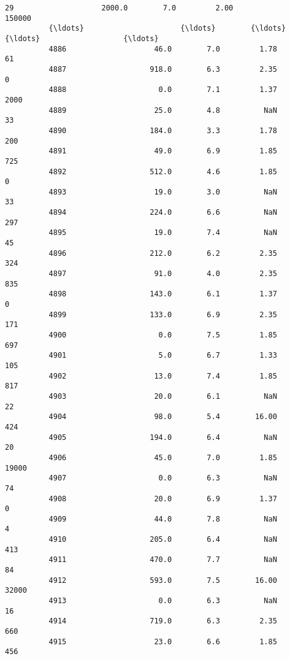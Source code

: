 \documentclass[11pt]{article}
\begin{document}
\begin{Verbatim}[commandchars=\\\{\}]
          29                    2000.0        7.0         2.00                150000   
          {\ldots}                      {\ldots}        {\ldots}          {\ldots}                   {\ldots}   
          4886                    46.0        7.0         1.78                    61   
          4887                   918.0        6.3         2.35                     0   
          4888                     0.0        7.1         1.37                  2000   
          4889                    25.0        4.8          NaN                    33   
          4890                   184.0        3.3         1.78                   200   
          4891                    49.0        6.9         1.85                   725   
          4892                   512.0        4.6         1.85                     0   
          4893                    19.0        3.0          NaN                    33   
          4894                   224.0        6.6          NaN                   297   
          4895                    19.0        7.4          NaN                    45   
          4896                   212.0        6.2         2.35                   324   
          4897                    91.0        4.0         2.35                   835   
          4898                   143.0        6.1         1.37                     0   
          4899                   133.0        6.9         2.35                   171   
          4900                     0.0        7.5         1.85                   697   
          4901                     5.0        6.7         1.33                   105   
          4902                    13.0        7.4         1.85                   817   
          4903                    20.0        6.1          NaN                    22   
          4904                    98.0        5.4        16.00                   424   
          4905                   194.0        6.4          NaN                    20   
          4906                    45.0        7.0         1.85                 19000   
          4907                     0.0        6.3          NaN                    74   
          4908                    20.0        6.9         1.37                     0   
          4909                    44.0        7.8          NaN                     4   
          4910                   205.0        6.4          NaN                   413   
          4911                   470.0        7.7          NaN                    84   
          4912                   593.0        7.5        16.00                 32000   
          4913                     0.0        6.3          NaN                    16   
          4914                   719.0        6.3         2.35                   660   
          4915                    23.0        6.6         1.85                   456   
          

\end{Verbatim}
\end{document}

